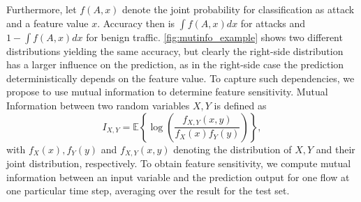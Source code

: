 \documentclass[conference]{IEEEtran}
\newcommand\note[2]{{\color{#1}#2}}
\newcommand\todo[1]{{\note{red}{TODO: #1}}}
\begin{document}
Furthermore, let $f(A,x)$  denote the joint probability
for classification as attack and a feature value $x$. Accuracy then is $\int f(A,x) dx$ for attacks and $1-\int f(A,x) dx$ for benign traffic.
\autoref{fig:mutinfo_example} shows two different distributions
yielding the same accuracy, but clearly the right-side distribution has a larger influence on the prediction, as in the right-side case the prediction deterministically depends on the feature value.
To capture such dependencies, we propose to use mutual information %
to determine feature sensitivity.
Mutual Information between two random variables $X,Y$ is defined as
\begin{equation}
I_{X,Y} = \mathbb E \left\{ \log\left(\frac{f_{X,Y}(x,y)}{f_X(x)f_Y(y)}\right) \right\},
\end{equation}
with $f_X(x), f_Y(y)$ and $f_{X,Y}(x,y)$ denoting the distribution of $X,Y$ and their joint distribution, respectively. To obtain feature sensitivity, we compute mutual information between an input variable and the prediction output for one flow at one particular time step, averaging over the result for the test set.
\end{document}
